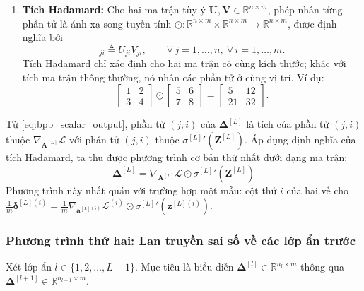 \begin{enumerate}
    \item \textbf{Tích Hadamard:} Cho hai ma trận tùy ý $\mathbf{U}, \mathbf{V} \in \mathbb{R}^{n \times m}$, phép nhân từng phần tử là ánh xạ song tuyến tính $\odot: \mathbb{R}^{n \times m} \times \mathbb{R}^{n \times m} \to \mathbb{R}^{n \times m}$, được định nghĩa bởi
    \begin{equation}
    [\mathbf{U} \odot \mathbf{V}]_{ji} \triangleq U_{ji}V_{ji}, \qquad \forall\, j = 1,\dots,n,\ \forall\, i = 1,\dots,m.
    \end{equation}
    Tích Hadamard chỉ xác định cho hai ma trận có cùng kích thước; khác với tích ma trận thông thường, nó nhân các phần tử ở cùng vị trí. Ví dụ:
    \[
    \begin{bmatrix}1&2\\3&4\end{bmatrix}\odot\begin{bmatrix}5&6\\7&8\end{bmatrix}
    =\begin{bmatrix}5&12\\21&32\end{bmatrix}.
    \]
\end{enumerate}
 
Từ \eqref{eq:bpb_scalar_output}, phần tử $(j,i)$ của $\boldsymbol{\Delta}^{[L]}$ là tích của phần tử $(j,i)$ thuộc $\nabla_{\mathbf{A}^{[L]}}\mathcal{L}$ với phần tử $(j,i)$ thuộc ${\sigma^{[L]}}'\!\left(\mathbf{Z}^{[L]}\right)$. Áp dụng định nghĩa của tích Hadamard, ta thu được phương trình cơ bản thứ nhất dưới dạng ma trận:
\begin{equation}
\boxed{
\boldsymbol{\Delta}^{[L]} = \nabla_{\mathbf{A}^{[L]}}\mathcal{L} \odot {\sigma^{[L]}}'\!\left(\mathbf{Z}^{[L]}\right)
}
\label{eq:bpb_output}
\end{equation}
Phương trình này nhất quán với trường hợp một mẫu: cột thứ $i$ của hai vế cho $\frac{1}{m}\boldsymbol{\delta}^{[L](i)} = \frac{1}{m}\nabla_{\mathbf{a}^{[L](i)}}\mathcal{L}^{(i)} \odot {\sigma^{[L]}}'\!\left(\mathbf{z}^{[L](i)}\right)$.
 
\subsubsection{Phương trình thứ hai: Lan truyền sai số về các lớp ẩn trước}
Xét lớp ẩn $l \in \{1,2,\dots,L-1\}$. Mục tiêu là biểu diễn $\boldsymbol{\Delta}^{[l]} \in \mathbb{R}^{n_l \times m}$ thông qua $\boldsymbol{\Delta}^{[l+1]} \in \mathbb{R}^{n_{l+1} \times m}$.
 
